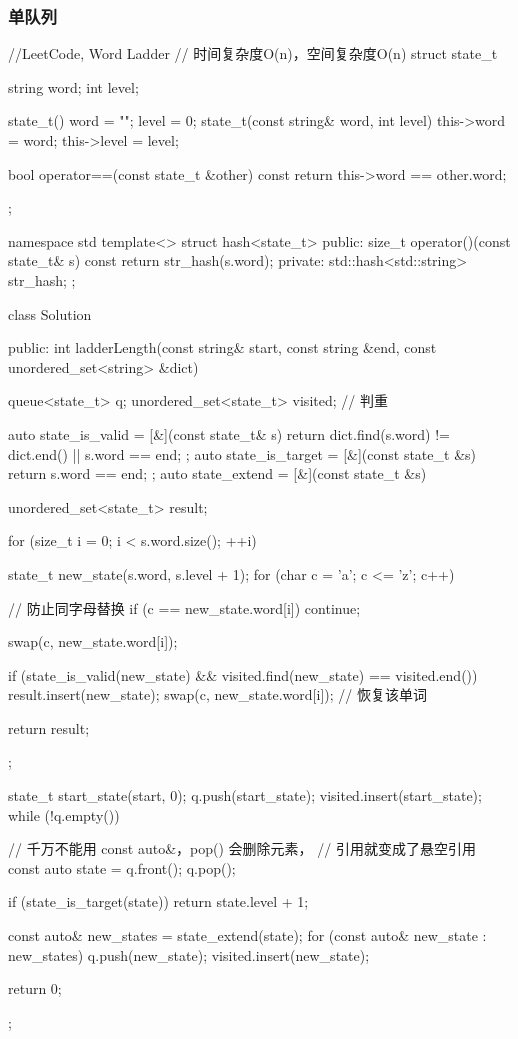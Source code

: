 \subsubsection{单队列}
\begin{Code}
//LeetCode, Word Ladder
// 时间复杂度O(n)，空间复杂度O(n)
struct state_t {
    string word;
    int level;

    state_t() { word = ""; level = 0; }
    state_t(const string& word, int level) {
        this->word = word;
        this->level = level;
    }

    bool operator==(const state_t &other) const {
        return this->word == other.word;
    }
};

namespace std {
    template<> struct hash<state_t> {
    public:
        size_t operator()(const state_t& s) const {
            return str_hash(s.word);
        }
    private:
        std::hash<std::string> str_hash;
    };
}


class Solution {
public:
    int ladderLength(const string& start, const string &end,
            const unordered_set<string> &dict) {
        queue<state_t> q;
        unordered_set<state_t> visited;  // 判重

        auto state_is_valid = [&](const state_t& s) {
            return dict.find(s.word) != dict.end() || s.word == end;
        };
        auto state_is_target = [&](const state_t &s) {return s.word == end; };
        auto state_extend = [&](const state_t &s) {
            unordered_set<state_t> result;

            for (size_t i = 0; i < s.word.size(); ++i) {
                state_t new_state(s.word, s.level + 1);
                for (char c = 'a'; c <= 'z'; c++) {
                    // 防止同字母替换
                    if (c == new_state.word[i]) continue;

                    swap(c, new_state.word[i]);

                    if (state_is_valid(new_state) &&
                        visited.find(new_state) == visited.end()) {
                        result.insert(new_state);
                    }
                    swap(c, new_state.word[i]); // 恢复该单词
                }
            }

            return result;
        };

        state_t start_state(start, 0);
        q.push(start_state);
        visited.insert(start_state);
        while (!q.empty()) {
            // 千万不能用 const auto&，pop() 会删除元素，
            // 引用就变成了悬空引用
            const auto state = q.front();
            q.pop();

            if (state_is_target(state)) {
                return state.level + 1;
            }

            const auto& new_states = state_extend(state);
            for (const auto& new_state : new_states) {
                q.push(new_state);
                visited.insert(new_state);
            }
        }
        return 0;
    }
};
\end{Code}


